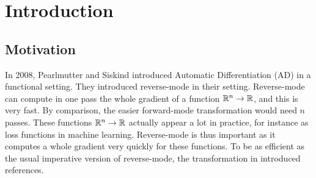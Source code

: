 \section{Introduction}



\subsection{Motivation}

In 2008, Pearlmutter and Siskind \cite{pearlmutter2008reverse} introduced Automatic Differentiation (AD) in a functional setting. 
They introduced reverse-mode in their setting. 
Reverse-mode can compute in one pass the whole gradient of a function $\mathbb{R}^n\to\mathbb{R}$, and this is very fast.
By comparison, the easier forward-mode transformation would need $n$ passes. 
These functions $\mathbb{R}^n\to\mathbb{R}$ actually appear a lot in practice, for instance as loss functions in machine learning.
Reverse-mode is thus important as it computes a whole gradient very quickly for these functions. 
To be as efficient as the usual imperative version of reverse-mode, the transformation in \cite{pearlmutter2008reverse} introduced references.

